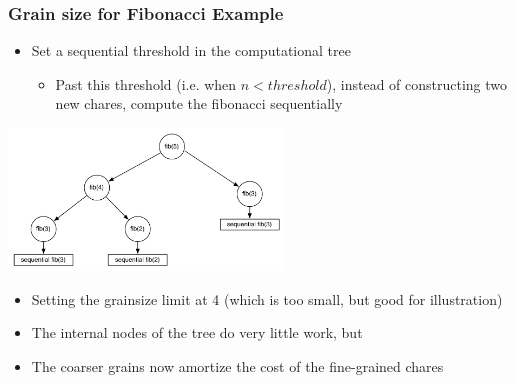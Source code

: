 

\begin{frame}[fragile]
  \frametitle{Grain size for Fibonacci Example}
  \begin{itemize}
  \item Set a sequential threshold in the computational tree
    \begin{itemize}
    \item Past this threshold (i.e. when $n < threshold$), instead of
      constructing two new chares, compute the fibonacci sequentially
    \end{itemize}
  \end{itemize}
  \begin{center} \includegraphics[width=0.55\textwidth]{figures/tree-threshold.pdf} \end{center}
  \begin{itemize}
    \item Setting the grainsize limit at 4 (which is too small, but
      good for illustration)
    \item The internal nodes of the tree do very little work, but
    \item The coarser grains now amortize the cost of the fine-grained chares
  \end{itemize}
\end{frame}

%   
